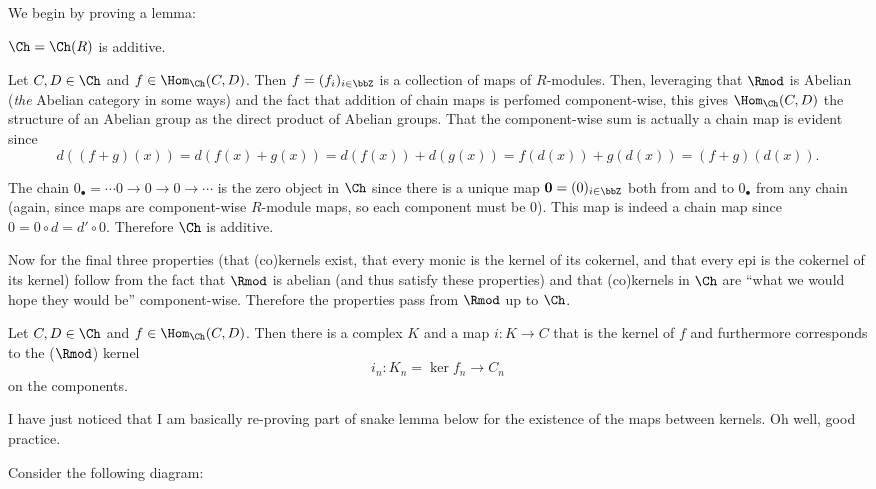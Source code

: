 \documentclass[12pt]{article}
\begin{document}
\begin{sol}
	We begin by proving a lemma:
	\begin{lem}\label{lem-chain-additive} 
		$\Ch=\Ch(R)$ is additive. 
	\end{lem}
	\begin{prf}
		Let $C,D\in\Ch$ and $f\in\Hom_{\Ch}(C,D)$. Then 
		$f=(f_i)_{i\in\bbZ}$ is a collection of maps of $R$-modules. Then, leveraging that $\Rmod$ is Abelian
		(\textit{the} Abelian category in some ways) and the fact that addition of chain maps is perfomed 
		component-wise, this gives $\Hom_{\Ch}(C,D)$ the structure of an Abelian group as the direct product
		of Abelian groups. That the component-wise sum is actually a chain map is evident since 
		\[d((f+g)(x))=d(f(x)+g(x))=d(f(x))+d(g(x))=f(d(x))+g(d(x))=(f+g)(d(x)).\]

		The chain $0_\bullet=\cdots 0 \to 0\to 0\to \cdots$ is the zero object in $\Ch$ since there is a 
		unique map $\mathbf{0}=(0)_{i\in\bbZ}$ both from and to $0_\bullet$ from any chain (again, since maps
		are component-wise $R$-module maps, so each component must be $0$). This map is indeed a chain map
		since $0=0\circ d=d'\circ 0$. Therefore $\Ch$ is additive.
	\end{prf}

	\brk

	Now for the final three properties (that (co)kernels exist, that every monic is the kernel of its cokernel,
	and that every epi is the cokernel of its kernel) follow from the fact that $\Rmod$ is abelian (and thus satisfy
	these properties) and that (co)kernels in $\Ch$ are ``what we would hope they would be'' component-wise. 
	Therefore the properties pass from $\Rmod$ up to $\Ch$.

	\begin{lem}\label{lem-chain-ker}
		Let $C,D\in\Ch$ and $f\in\Hom_{\Ch}(C,D)$. Then there is a complex $K$ and a map $i:K\to C$ 
		that is the kernel of $f$ and furthermore corresponds to the ($\Rmod$) kernel 
		\[i_n:K_n=\ker f_n\to C_n\]
		on the components.
	\end{lem}
	\begin{prf}
		\begin{rmk}
		I have just noticed that I am basically re-proving part of snake lemma below for the existence of the maps between
		kernels. Oh well, good practice.
		\end{rmk}
		Consider the following diagram:

	\begin{center}
	\end{center}


\end{prf}
\end{sol}
\end{document}

